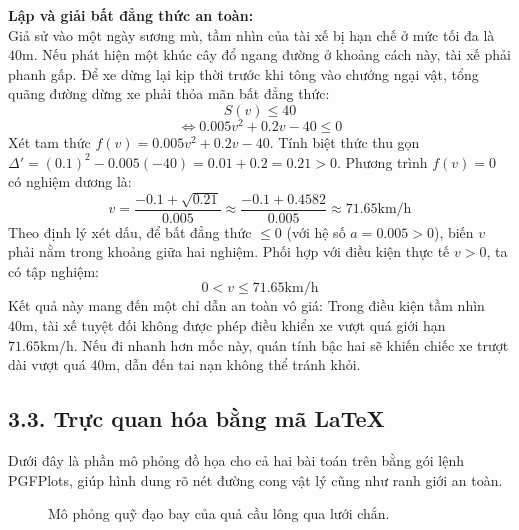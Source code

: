 \documentclass[14pt, a4paper, oneside]{extreport}
\begin{document}
\textbf{Lập và giải bất đẳng thức an toàn:} \\
Giả sử vào một ngày sương mù, tầm nhìn của tài xế bị hạn chế ở mức tối đa là $40\text{m}$. Nếu phát hiện một khúc cây đổ ngang đường ở khoảng cách này, tài xế phải phanh gấp. Để xe dừng lại kịp thời trước khi tông vào chướng ngại vật, tổng quãng đường dừng xe phải thỏa mãn bất đẳng thức:
\[ S(v) \le 40 \]
\[ \iff 0.005v^2 + 0.2v - 40 \le 0 \]
Xét tam thức $f(v) = 0.005v^2 + 0.2v - 40$. Tính biệt thức thu gọn $\Delta' = (0.1)^2 - 0.005(-40) = 0.01 + 0.2 = 0.21 > 0$. Phương trình $f(v) = 0$ có nghiệm dương là:
\[ v = \frac{-0.1 + \sqrt{0.21}}{0.005} \approx \frac{-0.1 + 0.4582}{0.005} \approx 71.65\text{km/h} \]
Theo định lý xét dấu, để bất đẳng thức $\le 0$ (với hệ số $a = 0.005 > 0$), biến $v$ phải nằm trong khoảng giữa hai nghiệm. Phối hợp với điều kiện thực tế $v > 0$, ta có tập nghiệm:
\[ 0 < v \le 71.65\text{km/h} \]
Kết quả này mang đến một chỉ dẫn an toàn vô giá: Trong điều kiện tầm nhìn $40\text{m}$, tài xế tuyệt đối không được phép điều khiển xe vượt quá giới hạn $71.65\text{km/h}$. Nếu đi nhanh hơn mốc này, quán tính bậc hai sẽ khiến chiếc xe trượt dài vượt quá $40\text{m}$, dẫn đến tai nạn không thể tránh khỏi.

\subsection*{3.3. Trực quan hóa bằng mã LaTeX}

Dưới đây là phần mô phỏng đồ họa cho cả hai bài toán trên bằng gói lệnh PGFPlots, giúp hình dung rõ nét đường cong vật lý cũng như ranh giới an toàn.

\begin{figure}[htbp]
\centering
{}
\caption{Mô phỏng quỹ đạo bay của quả cầu lông qua lưới chắn.}
\end{figure}
\end{document}
